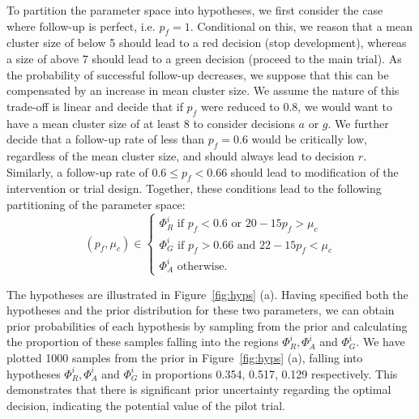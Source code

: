 \documentclass[AMA,STIX1COL]{WileyNJD-v2}
\begin{document}
To partition the parameter space into hypotheses, we first consider the case where follow-up is perfect, i.e. $p_{f} = 1$. Conditional on this, we reason that a mean cluster size of below 5 should lead to a red decision (stop development), whereas a size of above 7 should lead to a green decision (proceed to the main trial). As the probability of successful follow-up decreases, we suppose that this can be compensated by an increase in mean cluster size. We assume the nature of this trade-off is linear and decide that if $p_{f}$ were reduced to 0.8, we would want to have a mean cluster size of at least 8 to consider decisions $a$ or $g$.  We further decide that a follow-up rate of less than $p_{f} = 0.6$ would be critically low, regardless of the mean cluster size, and should always lead to decision $r$. Similarly, a follow-up rate of $0.6 \leq p_{f} < 0.66$ should lead to modification of the intervention or trial design. Together, these conditions lead to the following partitioning of the parameter space:
\begin{equation}
  (p_{f}, \mu_{c}) \in \begin{cases}
               \Phi^i_R \text{ if } p_{f} < 0.6 \text{ or } 20-15p_{f} > \mu_{c} \\
               \Phi^i_G \text{ if } p_{f} > 0.66 \text{ and } 22-15p_{f} < \mu_{c} \\
               \Phi^i_A \text{ otherwise.}
            \end{cases}
\end{equation}

The hypotheses are illustrated in Figure~\ref{fig:hyps} (a). Having specified both the hypotheses and the prior distribution for these two parameters, we can obtain prior probabilities of each hypothesis by sampling from the prior and calculating the proportion of these samples falling into the regions $\Phi^i_R, \Phi^i_A$ and $\Phi^i_G$. We have plotted 1000 samples from the prior in Figure~\ref{fig:hyps} (a), falling into hypotheses  $\Phi^i_R, \Phi^i_A$ and $\Phi^i_G$ in proportions 0.354, 0.517, 0.129 respectively. This demonstrates that there is significant prior uncertainty regarding the optimal decision, indicating the potential value of the pilot trial.
\end{document}
